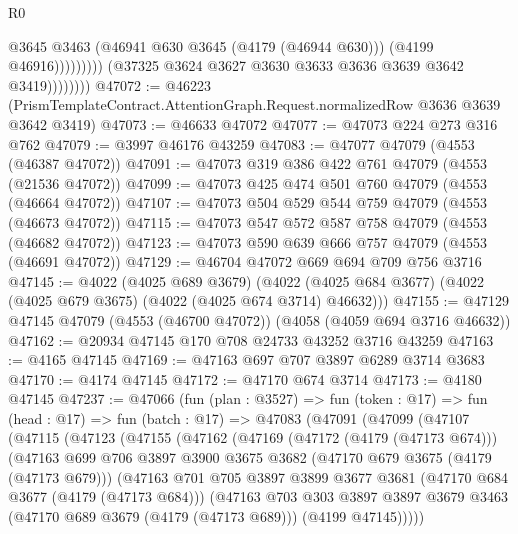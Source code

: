 \begin{lexlean}{R0}
\begin{coremodule}
                                  @3645
                                  @3463
                                  (@46941 @630 @3645 (@4179 (@46944 @630)))
                                  (@4199 @46916)))))))))
                  (@37325 @3624 @3627 @3630 @3633 @3636 @3639 @3642 @3419))))))))
@47072 := @46223
    (PrismTemplateContract.AttentionGraph.Request.normalizedRow @3636 @3639 @3642 @3419)
@47073 := @46633 @47072
@47077 := @47073 @224 @273 @316 @762
@47079 := @3997 @46176 @43259
@47083 := @47077 @47079 (@4553 (@46387 @47072))
@47091 := @47073 @319 @386 @422 @761 @47079 (@4553 (@21536 @47072))
@47099 := @47073 @425 @474 @501 @760 @47079 (@4553 (@46664 @47072))
@47107 := @47073 @504 @529 @544 @759 @47079 (@4553 (@46673 @47072))
@47115 := @47073 @547 @572 @587 @758 @47079 (@4553 (@46682 @47072))
@47123 := @47073 @590 @639 @666 @757 @47079 (@4553 (@46691 @47072))
@47129 := @46704 @47072 @669 @694 @709 @756 @3716
@47145 := @4022
    (@4025 @689 @3679)
    (@4022 (@4025 @684 @3677) (@4022 (@4025 @679 @3675) (@4022 (@4025 @674 @3714) @46632)))
@47155 := @47129 @47145 @47079 (@4553 (@46700 @47072)) (@4058 (@4059 @694 @3716 @46632))
@47162 := @20934 @47145 @170 @708 @24733 @43252 @3716 @43259
@47163 := @4165 @47145
@47169 := @47163 @697 @707 @3897 @6289 @3714 @3683
@47170 := @4174 @47145
@47172 := @47170 @674 @3714
@47173 := @4180 @47145
@47237 := @47066
    (fun (plan : @3527) =>
    fun (token : @17) =>
    fun (head : @17) =>
    fun (batch : @17) =>
    @47083
      (@47091
        (@47099
          (@47107
            (@47115
              (@47123
                (@47155
                  (@47162
                    (@47169
                      (@47172 (@4179 (@47173 @674)))
                      (@47163
                        @699
                        @706
                        @3897
                        @3900
                        @3675
                        @3682
                        (@47170 @679 @3675 (@4179 (@47173 @679)))
                        (@47163
                          @701
                          @705
                          @3897
                          @3899
                          @3677
                          @3681
                          (@47170 @684 @3677 (@4179 (@47173 @684)))
                          (@47163
                            @703
                            @303
                            @3897
                            @3897
                            @3679
                            @3463
                            (@47170 @689 @3679 (@4179 (@47173 @689)))
                            (@4199 @47145)))))

\end{coremodule}
\end{lexlean}
